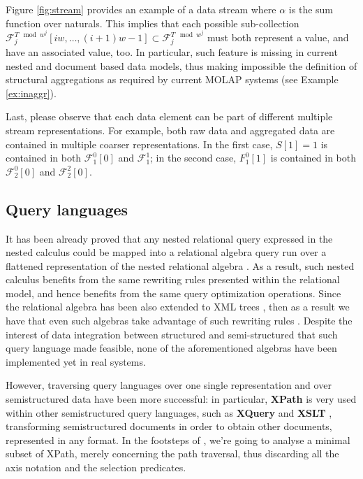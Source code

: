 \begin{example}
Figure \ref{fig:stream} provides an example of a data stream where $\alpha$ is the sum function over naturals. This implies that each possible sub-collection $\mathcal{F}_{j}^{T\mod{w^j}}[iw,\dots,(i+1)w-1]\subset \mathcal{F}_{j}^{T\mod{w^j}}$ must both represent a value, and have an associated value, too. In particular, such feature is missing in current nested and document based data models, thus making impossible the definition of structural aggregations as required by current MOLAP systems (see Example \vref{ex:inaggr}). 

Last, please observe that each data element can be part of different multiple stream representations. For example, both raw data and aggregated data are contained in multiple coarser representations. In the first case, $S[1]=1$ is contained in both $\mathcal{F}_1^0[0]$ and $\mathcal{F}_1^1$; in the second case, $F_1^0[1]$ is contained in both $\mathcal{F}_2^0[0]$ and $\mathcal{F}_2^2[0]$.
\end{example}


\subsection{Query languages}
It has been already proved that any nested relational query expressed in the nested calculus could be mapped into a relational algebra query run over a flattened representation of the nested relational algebra  \cite{ParedaensG92}. As a result, such nested calculus benefits from the same rewriting rules presented within the relational model, and hence benefits from the same query optimization operations. Since the relational algebra has been also extended to XML trees \cite{Lu2006}, then as a result we have that even such algebras take advantage of such rewriting rules \cite{Magnani06}. Despite the interest of data integration between structured and semi-structured that such query language made feasible, none of the aforementioned algebras have been implemented yet in real systems.

However, traversing query languages over one single representation and over semistructured data have been more successful: in particular, \textbf{XPath} \cite{xpath31} is very used within other semistructured query languages, such as \textbf{XQuery} \cite{XQuery} and \textbf{XSLT} \cite{Tidwell},  transforming semistructured documents in order to obtain other documents, represented in any format. %
In the footsteps of \cite{Magnani06}, we're going to analyse a minimal subset of XPath, merely concerning the path traversal, thus discarding all the axis notation and the selection predicates. 


